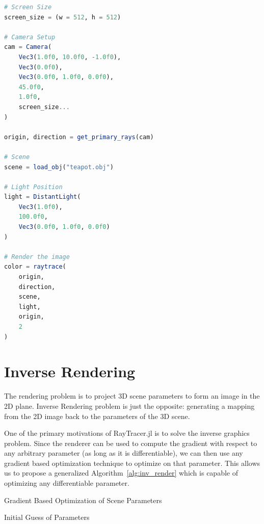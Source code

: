 \documentclass{juliacon}
\begin{document}
\begin{lstlisting}[caption = {Rendering the Utah Teapot Model},
                   label = {lst:example_render},
                   captionpos = b,
                   language = Julia]
# Screen Size
screen_size = (w = 512, h = 512)
    
# Camera Setup
cam = Camera(
    Vec3(1.0f0, 10.0f0, -1.0f0),
    Vec3(0.0f0),
    Vec3(0.0f0, 1.0f0, 0.0f0),
    45.0f0,
    1.0f0,
    screen_size...
)
                 
origin, direction = get_primary_rays(cam)
    
# Scene
scene = load_obj("teapot.obj")
    
# Light Position
light = DistantLight(
    Vec3(1.0f0),
    100.0f0,
    Vec3(0.0f0, 1.0f0, 0.0f0)
)
                         
# Render the image
color = raytrace(
    origin,
    direction,
    scene,
    light,
    origin,
    2
)
\end{lstlisting}

\section{Inverse Rendering}

The rendering problem is to project 3D scene parameters to form an image in the 2D plane. Inverse Rendering problem is just the opposite: generating a mapping from the 2D image back to the parameters of the 3D scene.

One of the primary motivations of RayTracer.jl is to solve the inverse graphics problem. Since the renderer can be used to compute the gradient with respect to any arbitrary parameter (as long as it is differentiable), we can then use any gradient based optimization technique to optimize on that parameter. This allows us to propose a generalized Algorithm~\ref{alg:inv_render} which is capable of optimizing any differentiable parameter.

\begin{algorithm}[!htb]
    \caption{Gradient Based Optimization of Scene Parameters}
    \label{alg:inv_render}
    \SetAlgoLined
    Initial Guess of Parameters\;
\end{algorithm}
\end{document}
